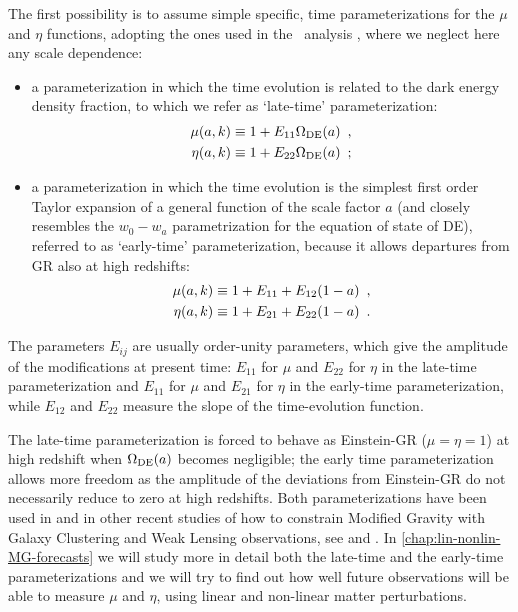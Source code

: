 The first possibility is to assume simple specific, time parameterizations for
the $\mu$ and $\eta$ functions, adopting the ones used in the
\planck\ analysis \cite{planck_collaboration_planck_2016}, where we neglect here any scale dependence:
\begin{itemize}
	\item a parameterization in which the time evolution is related to the dark
	energy density fraction, to which we refer as `late-time' parameterization:
	\begin{eqnarray}
	\mu(a,k)\equiv1+E_{{\rm 11}}\Omega_{{\rm
			DE}}(a)\,\,\,,\label{eq:DE-mu-parametrization}\\
	\eta(a,k)\equiv1+E_{{\rm 22}}\Omega_{{\rm
			DE}}(a)\,\,\,;\label{eq:DE-eta-parametrization}
	\end{eqnarray}
	
	\item a parameterization in which the time evolution is the simplest first
	order Taylor expansion of a general function of the scale factor $a$
	(and closely resembles the $w_{0}-w_{a}$ parametrization for the
	equation of state of DE), referred to as `early-time' parameterization, because it
	allows departures from GR also at high redshifts:
	\begin{eqnarray}
	\mu(a,k)\equiv1+E_{{\rm 11}}+E_{{\rm
			12}}(1-a)\,\,\,,\label{eq:TR-mu-parametrization}\\
	\eta(a,k)\equiv1+E_{{\rm 21}}+E_{{\rm
			22}}(1-a)\,\,\,.\label{eq:TR-eta-parametrization}
	\end{eqnarray}
	
\end{itemize}
The parameters $E_{i j}$ are usually order-unity parameters, which give the amplitude of the modifications
at present time: $E_{11}$ for $\mu$ and $E_{22}$ for $\eta$ in the late-time parameterization and 
$E_{11}$ for $\mu$ and $E_{21}$ for $\eta$ in the early-time parameterization, while
$E_{12}$ and $E_{22}$ measure the slope of the time-evolution function.


The late-time parameterization is forced to behave as Einstein-GR ($\mu=\eta=1$)
at high redshift when $\Omega_{{\rm DE}}(a)$ becomes negligible;
the early time parameterization allows more freedom as the amplitude of the deviations
from Einstein-GR do not necessarily reduce to zero at high redshifts. 
Both parameterizations have been used in \cite{planck_collaboration_planck_2016}
and in other recent studies of how to constrain Modified Gravity with Galaxy Clustering and Weak Lensing observations, see
\cite{bull_extending_2015, Gleyzes2016} and \cite{Alonso2016}.
In \cref{chap:lin-nonlin-MG-forecasts} we will study more in detail both the late-time and the early-time parameterizations and we will
try to find out how well future observations will be able to measure $\mu$ and $\eta$, using linear and non-linear
matter perturbations.


